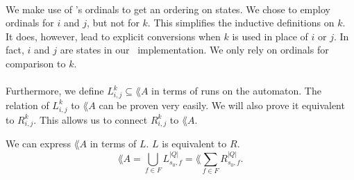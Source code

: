 \documentclass[11pt,a4paper,oneside]{book}
\begin{document}
                    \paragraph{}
                        We make use of \ssreflect's ordinals to get an ordering on states. 
                        We chose to employ ordinals for $i$ and $j$, but not for $k$. 
                        This simplifies the inductive definitions on $k$. 
                        It does, however, lead to explicit conversions when $k$ is used in place of $i$ or $j$.
                        In fact, $i$ and $j$ are states in our \coq\ implementation. 
                        We only rely on ordinals for comparison to $k$.
                    \paragraph{}
                        Furthermore, we define $L^k_{i,j} \subseteq \lang{A}$ in terms of runs on the automaton. 
                        The relation of $L^k_{i,j}$ to $\lang{A}$ can be proven very easily.
                        We will also prove it equivalent to $R^k_{i,j}$.
                        This allows us to connect $R^k_{i,j}$ to $\lang{A}$.
                        \vspace{-0.3cm} 
                    
                    \begin{theorem} We can express $\lang{A}$ in terms of $L$. $L$ is equivalent to $R$.
                        \label{LR}
                        \[
                             \lang{A} = \bigcup\limits_{f \in F} L^{|Q|}_{s_0, f} = \lang{\sum\limits_{f \in F} R^{|Q|}_{s_0, f}}.
                        \]
                    \end{theorem}
\end{document}
